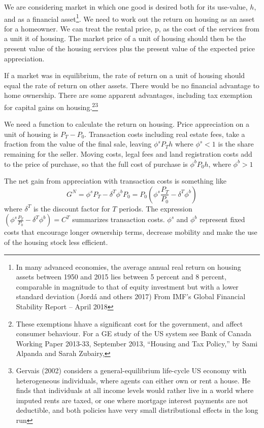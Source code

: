 We are considering market in which one good is desired  both for its use-value, $h$, and as a financial asset\footnote{ In many advanced economies, the average annual real return on housing assets between 1950 and 2015 lies between 5 percent and 8 percent, comparable in magnitude to that of equity investment but with a lower standard deviation (Jord\'a and others 2017) From IMF’s Global Financial Stability Report – April 2018}.   We need to work out the return on housing as an asset for a homeowner. We can treat the rental price, p, as the cost of the services from a unit it of housing. The market price of a unit of housing  should then be the present value of the housing services plus the present value of the expected price appreciation. 

If a market was in equilibrium, the rate of return on a unit of housing should equal the rate of return on other assets. There would be no financial advantage to home ownership. There are some apparent advantages, including  tax exemption for capital gains on housing.\footnote{These exemptions hhave a significant cost for the government, and affect consumer behaviour. For a GE study of  the US system see Bank of Canada Working Paper 2013-33, September 2013, ``Housing and Tax Policy,'' by Sami Alpanda and Sarah Zubairy,}\footnote{Gervais (2002) considers a general-equilibrium life-cycle US economy with heterogeneous individuals, where agents can either own or rent a house. He finds that individuals at all income levels would rather live in a world where imputed rents are taxed, or one where mortgage interest payments are not deductible, and both policies have very small distributional effects in the long run}


We need a function to calculate the return on housing.  Price appreciation on a unit of housing is $P_T-P_0$. Transaction costs including real estate fees, take a fraction from the value of the final sale, leaving $\phi^sP_Th$ where $\phi^s<1$ is the share remaining for the seller. Moving costs, legal fees and land registration costs add to the price of purchase, so that the full cost of purchase is $\phi^bP_0h$, where $\phi^b>1$

The net gain from appreciation with transaction costs is something like \[G^N=\phi^s P_T-\delta^T\phi^b P_0=P_0(\phi^s \frac{P_T}{P_0}-\delta^T\phi^b)\]%
where $\delta^T$ is the discount factor for $T$ periods. The expression $(\phi^s \frac{P_T}{P_0}-\delta^T\phi^b)=C^T$ summarizes transaction costs. $\phi^s$ and $\phi^b$ represent  fixed costs that  encourage longer ownership terms, decrease mobility and make the use of the housing stock less efficient. 


